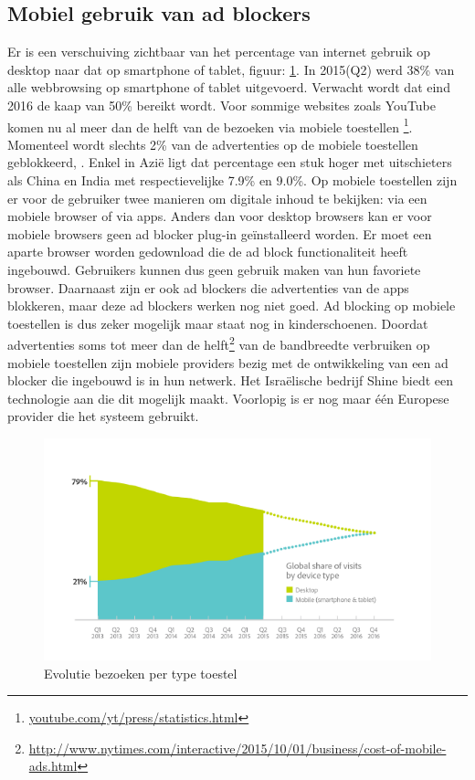 \documentclass[pdftex,a4paper,12pt,twoside]{report}
\begin{document}
\subsection{Mobiel gebruik van ad blockers}
\label{sec Mobiel gebruik van ad blockers}
Er is een verschuiving zichtbaar van het percentage van internet gebruik op desktop naar dat op smartphone of tablet, figuur: \ref{fig: MobileVsDeskotpInternet}. In 2015(Q2) werd 38\% van alle webbrowsing op smartphone of tablet uitgevoerd. Verwacht wordt dat eind 2016 de kaap van 50\% bereikt wordt. Voor sommige websites zoals YouTube komen nu al meer dan de helft van de bezoeken via mobiele toestellen \footnote{\url{youtube.com/yt/press/statistics.html}}. Momenteel wordt slechts 2\% van de advertenties op de mobiele toestellen geblokkeerd, \cite{PageFair2015}. Enkel in Azië ligt dat percentage een stuk hoger met uitschieters als China en India met respectievelijke 7.9\% en 9.0\%. 
Op mobiele toestellen zijn er voor de gebruiker twee manieren om digitale inhoud te bekijken: via een mobiele browser of via apps. Anders dan voor desktop browsers kan er voor mobiele browsers geen ad blocker plug-in geïnstalleerd worden. Er moet een aparte browser worden gedownload die de ad block functionaliteit heeft ingebouwd. Gebruikers kunnen dus geen gebruik maken van hun favoriete browser. Daarnaast zijn er ook ad blockers die advertenties van de apps blokkeren, maar deze ad blockers werken nog niet goed. Ad blocking op mobiele toestellen is dus zeker mogelijk maar staat nog in kinderschoenen.
Doordat advertenties soms tot meer dan de helft\footnote{\url{http://www.nytimes.com/interactive/2015/10/01/business/cost-of-mobile-ads.html}} van de bandbreedte verbruiken op mobiele toestellen zijn mobiele providers bezig met de ontwikkeling van een ad blocker die ingebouwd is in hun netwerk. Het Israëlische bedrijf Shine biedt een technologie aan die dit mogelijk maakt. Voorlopig is er nog maar één Europese provider die het systeem gebruikt.


\begin{figure}[h!]
\centering
\includegraphics[width=12cm]{img/MobileVsDeskotpInternet}
\caption{Evolutie bezoeken per type toestel}
\label{fig: MobileVsDeskotpInternet}
\end{figure}
\end{document}
